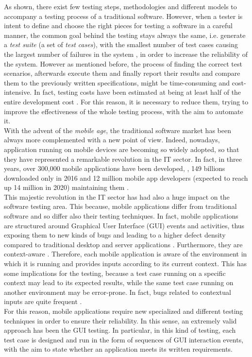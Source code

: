 As shown, there exist few testing steps, methodologies and different models to accompany a testing process of a traditional software. However, when a tester is intent to define and choose the right pieces for testing a software in a careful manner, the common goal behind the testing stays always the same, i.e. generate a \textit{test suite} (a set of \textit{test cases}), with the smallest number of test cases causing the largest number of failures in the system \cite{grano}, in order to increase the reliability of the system. 
However as mentioned before, the process of finding the correct test scenarios, afterwards execute them and finally report their results and compare them to the previously written specifications, might be time-consuming and cost-intensive. In fact, testing costs have been estimated at being at least half of the entire development cost \cite{Beizer:1990:STT:79060}. For this reason, it is necessary to reduce them, trying to improve the effectiveness of the whole testing process, with the aim to automate it. \\

With the advent of the \textit{mobile age}, the traditional software market has been always more complemented with a new point of view. Indeed, nowadays, application running on mobile devices are becoming so widely adopted, so that they have represented a remarkable revolution in the IT sector. In fact, in three years, over 300,000 mobile applications have been developed, \cite{muccini}, 149 billions downloaded only in 2016 \cite{statista} and 12 million mobile app developers (expected to reach up 14 million in 2020) maintaining them \cite{DevRelate}. \\
This majestic revolution in the IT sector has had also a huge impact on the software testing area. This because, mobile applications differ from traditional software and so differ also their testing techniques. 
In fact, mobile applications are structured around Graphical User Interface (GUI) events and activities, thus exposing them to new kinds of bugs and leading to a higher defect density compared to traditional desktop and server applications \cite{Hu:2011:AGT:1982595.1982612}. Furthermore, they are context-aware \cite{muccini}. 
Therefore, each mobile application is aware of the environment in which it is running and provides inputs according to its current context. This has some implications for the testing, because a test case running on a specific context may lead to its expected results, while the same test case running on another environment may be error-prone. In fact, bugs related to contextual inputs are quite frequent \cite{muccini}. \\
For this reason, mobile applications require new specialized and different testing techniques \cite{muccini} in order to ensure their reliability. In this sense, an extremely valid approach has been the GUI testing. In particular, in this kind of testing, each test case is designed and run in the form of sequences of GUI interaction events, with the aim to state whether an application meets its written requirements. 

